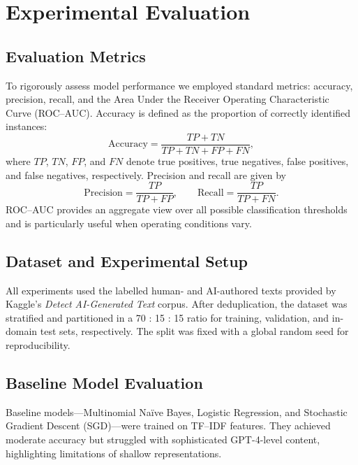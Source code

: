 \section{Experimental Evaluation}  %

\subsection{Evaluation Metrics}  %
To rigorously assess model performance we employed standard metrics:
accuracy, precision, recall, and the Area Under the Receiver Operating
Characteristic Curve (ROC–AUC). Accuracy is defined as the proportion
of correctly identified instances:
\begin{equation}
\text{Accuracy} = \frac{TP + TN}{TP + TN + FP + FN},
\end{equation}
where $TP$, $TN$, $FP$, and $FN$ denote true positives, true negatives,
false positives, and false negatives, respectively.
Precision and recall are given by
\begin{equation}
\text{Precision} = \frac{TP}{TP + FP},
\qquad
\text{Recall}   = \frac{TP}{TP + FN}.
\end{equation}
ROC–AUC provides an aggregate view over all possible classification
thresholds and is particularly useful when operating conditions vary.

\subsection{Dataset and Experimental Setup}  %
All experiments used the labelled human- and AI-authored texts provided by
Kaggle’s \emph{Detect AI-Generated Text} corpus.  After deduplication, the dataset was stratified and partitioned in a
70 : 15 : 15 ratio for training, validation, and in-domain test sets,
respectively. {The split was fixed with a global random seed for
reproducibility.}

\subsection{Baseline Model Evaluation}  %
Baseline models—Multinomial Naïve Bayes, Logistic Regression, and
Stochastic Gradient Descent (SGD)—were trained on TF–IDF features.
They achieved moderate accuracy but struggled with sophisticated
GPT-4-level content, highlighting limitations of shallow representations.

